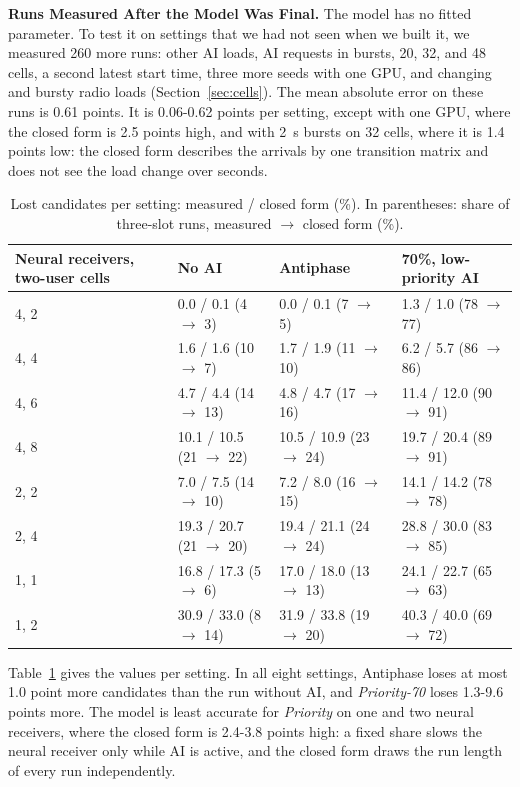 \documentclass[acmsmall,screen,review,anonymous]{acmart}
\newcommand{\sys}{Antiphase\xspace}
\begin{document}
\noindent\textbf{Runs Measured After the Model Was Final.} The model has no fitted parameter. To test it on
settings that we had not seen when we built it, we measured 260 more runs: other AI loads, AI requests in
bursts, 20, 32, and 48 cells, a second latest start time, three more seeds with one GPU, and changing and
bursty radio loads (Section~\ref{sec:cells}). The mean absolute error on these runs is 0.61 points. It is
0.06-0.62 points per setting, except with one GPU, where the closed form is 2.5 points high, and with 2~s
bursts on 32 cells, where it is 1.4 points low: the closed form describes the arrivals by one transition
matrix and does not see the load change over seconds.

\begin{table}[t]
\caption{Lost candidates per setting: measured / closed form (\%). In parentheses: share of three-slot
runs, measured $\rightarrow$ closed form (\%).}
\label{tab:modelcond}
\footnotesize
\begin{tabular}{@{}llll@{}}
\toprule
Neural receivers, two-user cells & No AI & \sys & 70\%, low-priority AI \\
\midrule
4, 2 & 0.0 / 0.1 (4 $\rightarrow$ 3) & 0.0 / 0.1 (7 $\rightarrow$ 5) & 1.3 / 1.0 (78 $\rightarrow$ 77) \\
4, 4 & 1.6 / 1.6 (10 $\rightarrow$ 7) & 1.7 / 1.9 (11 $\rightarrow$ 10) & 6.2 / 5.7 (86 $\rightarrow$ 86) \\
4, 6 & 4.7 / 4.4 (14 $\rightarrow$ 13) & 4.8 / 4.7 (17 $\rightarrow$ 16) & 11.4 / 12.0 (90 $\rightarrow$ 91) \\
4, 8 & 10.1 / 10.5 (21 $\rightarrow$ 22) & 10.5 / 10.9 (23 $\rightarrow$ 24) & 19.7 / 20.4 (89 $\rightarrow$ 91) \\
2, 2 & 7.0 / 7.5 (14 $\rightarrow$ 10) & 7.2 / 8.0 (16 $\rightarrow$ 15) & 14.1 / 14.2 (78 $\rightarrow$ 78) \\
2, 4 & 19.3 / 20.7 (21 $\rightarrow$ 20) & 19.4 / 21.1 (24 $\rightarrow$ 24) & 28.8 / 30.0 (83 $\rightarrow$ 85) \\
1, 1 & 16.8 / 17.3 (5 $\rightarrow$ 6) & 17.0 / 18.0 (13 $\rightarrow$ 13) & 24.1 / 22.7 (65 $\rightarrow$ 63) \\
1, 2 & 30.9 / 33.0 (8 $\rightarrow$ 14) & 31.9 / 33.8 (19 $\rightarrow$ 20) & 40.3 / 40.0 (69 $\rightarrow$ 72) \\
\bottomrule
\end{tabular}
\end{table}

Table~\ref{tab:modelcond} gives the values per setting. In all eight settings, \sys loses at most 1.0 point
more candidates than the run without AI, and \textit{Priority-70} loses 1.3-9.6 points more.
The model is least accurate for \textit{Priority} on one and two neural receivers, where
the closed form is 2.4-3.8 points high: a fixed share slows the neural receiver only while AI is active, and
the closed form draws the run length of every run independently.
\end{document}
